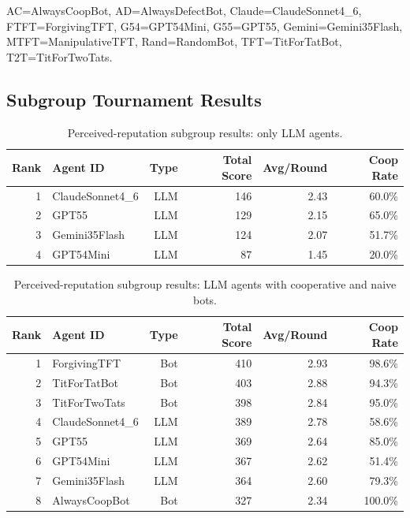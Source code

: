 \documentclass[11pt]{article}
\begin{document}
\begin{table}[H]
\vspace{0.3em}
\begin{flushleft}
\scriptsize
AC=AlwaysCoopBot, AD=AlwaysDefectBot, Claude=ClaudeSonnet4\_6, FTFT=ForgivingTFT, G54=GPT54Mini, G55=GPT55, Gemini=Gemini35Flash, MTFT=ManipulativeTFT, Rand=RandomBot, TFT=TitForTatBot, T2T=TitForTwoTats.
\end{flushleft}
\end{table}

\subsection{Subgroup Tournament Results}

\begin{table}[H]
\centering
\caption{Perceived-reputation subgroup results: only LLM agents.}
\label{tab:reputation_subgroup_llm_only}
\begin{tabular}{rlrrrr}
\toprule
Rank & Agent ID & Type & Total Score & Avg/Round & Coop Rate \\
\midrule
1 & ClaudeSonnet4\_6 & LLM & 146 & 2.43 & 60.0\% \\
2 & GPT55 & LLM & 129 & 2.15 & 65.0\% \\
3 & Gemini35Flash & LLM & 124 & 2.07 & 51.7\% \\
4 & GPT54Mini & LLM & 87 & 1.45 & 20.0\% \\
\bottomrule
\end{tabular}
\end{table}

\begin{table}[H]
\centering
\caption{Perceived-reputation subgroup results: LLM agents with cooperative and naive bots.}
\label{tab:reputation_subgroup_llm_cooperative}
\begin{tabular}{rlrrrr}
\toprule
Rank & Agent ID & Type & Total Score & Avg/Round & Coop Rate \\
\midrule
1 & ForgivingTFT & Bot & 410 & 2.93 & 98.6\% \\
2 & TitForTatBot & Bot & 403 & 2.88 & 94.3\% \\
3 & TitForTwoTats & Bot & 398 & 2.84 & 95.0\% \\
4 & ClaudeSonnet4\_6 & LLM & 389 & 2.78 & 58.6\% \\
5 & GPT55 & LLM & 369 & 2.64 & 85.0\% \\
6 & GPT54Mini & LLM & 367 & 2.62 & 51.4\% \\
7 & Gemini35Flash & LLM & 364 & 2.60 & 79.3\% \\
8 & AlwaysCoopBot & Bot & 327 & 2.34 & 100.0\% \\
\bottomrule
\end{tabular}
\end{table}
\end{document}
